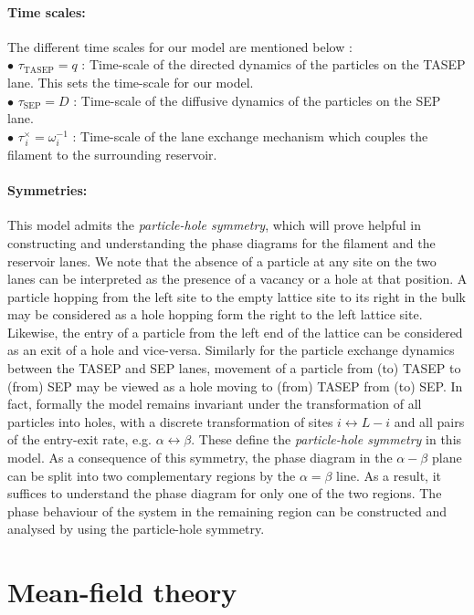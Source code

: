 \documentclass[aps,pre,twocolumn,superscriptaddress,amsmath,amssymb,longbibliography,floatfix]{revtex4}
\begin{document}
\paragraph{Time scales:}  The different time scales for our model are mentioned below :\\
$\bullet$ $\tau_\text{TASEP} = {q}$ : Time-scale of the directed dynamics of the particles on the TASEP lane. 
This sets the time-scale for our model.
\\
$\bullet$ $\tau_\text{SEP} = D$ : Time-scale of the diffusive dynamics of the 
particles on the SEP lane. 
\\
$\bullet$ $\tau^\times_{\,i} = \omega_i^{-1}$ : Time-scale of the lane exchange mechanism which 
couples the filament to the surrounding reservoir. 
\paragraph{Symmetries:}  This model admits   the {\em particle-hole symmetry}, which
will prove helpful in constructing and understanding the phase diagrams for the filament and the reservoir lanes.
We note that the absence of a particle at any site on the two lanes can be interpreted as the presence of a 
vacancy or a hole at that position. A particle hopping from the left site to the empty lattice
site to its right in the bulk may be considered as a hole hopping form the right to the left
lattice site. Likewise, the entry of a particle from the left end of the lattice can be 
considered as an exit of a hole and vice-versa. Similarly for the particle exchange dynamics between the TASEP and SEP lanes, movement of a particle from (to) TASEP to (from) SEP may be viewed as a hole moving to (from) TASEP from (to) SEP.
In fact, formally the model remains invariant under the
transformation of all particles into holes, with a discrete transformation of sites 
$i \leftrightarrow L - i$ and all pairs of the entry-exit rate, e.g. $\alpha \leftrightarrow \beta$. These define the {\em particle-hole symmetry} in this model.
As a consequence of this  symmetry, the phase diagram in the $\alpha-\beta$ plane
can be split into two complementary regions by the $\alpha = \beta$ line. As a result, it suffices
to understand the phase diagram for only one of the two regions.
The phase behaviour of the system in the remaining region can be constructed and analysed
by using the particle-hole symmetry.



\section{Mean-field theory}\label{mft}
\end{document}
